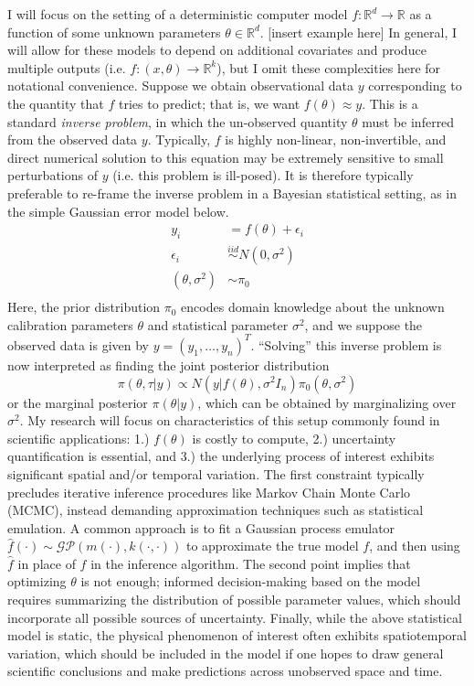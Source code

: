 \documentclass[12pt]{article}
\newcommand{\R}{\mathcal{R}}
\def\R{\mathbb{R}}
\begin{document}
I will focus on the setting of a deterministic computer model $f: \R^d \to \R$ as a function of some unknown parameters $\theta \in \R^d$. [insert example here] In general, I will allow
for these models to depend on additional covariates and produce multiple outputs (i.e. $f: (x, \theta) \to \R^k$), but I omit these complexities here for notational convenience. Suppose 
we obtain observational data $y$ corresponding to the quantity that $f$ tries to predict; that is, we want $f(\theta) \approx y$. This is a standard \textit{inverse problem}, in which
the un-observed quantity $\theta$ must be inferred from the observed data $y$. Typically, $f$ is highly non-linear, non-invertible, and direct numerical solution to this equation may be extremely sensitive
to small perturbations of $y$ (i.e. this problem is ill-posed). It is therefore typically preferable to re-frame the inverse problem in a Bayesian statistical setting, as in the simple Gaussian error model below. 
\begin{align*}
y_i &= f(\theta) + \epsilon_i \\
\epsilon_i &\overset{iid}{\sim} N(0, \sigma^2) \\
(\theta, \sigma^2) &\sim \pi_0 \\
\end{align*}
Here, the prior distribution $\pi_0$ encodes domain knowledge about the unknown calibration parameters $\theta$ and statistical parameter $\sigma^2$, and we suppose the observed data is given by 
$y = (y_1, \dots, y_n)^T$. ``Solving'' this inverse problem is now interpreted as finding the joint posterior distribution
\[\pi(\theta, \tau|y) \propto N(y|f(\theta), \sigma^2 I_n)\pi_0(\theta, \sigma^2)\]
or the marginal posterior $\pi(\theta|y)$, which can be obtained by marginalizing over $\sigma^2$. My research will focus on characteristics of this setup commonly found in scientific applications: 1.) $f(\theta)$ is
costly to compute, 2.) uncertainty quantification is essential, and 3.) the underlying process of interest exhibits significant spatial and/or temporal variation. The first constraint typically precludes iterative inference 
procedures like Markov Chain Monte Carlo (MCMC), instead demanding approximation techniques such as statistical emulation. A common approach is to fit a Gaussian process emulator 
$\hat{f}(\cdot) \sim \mathcal{GP}(m(\cdot), k(\cdot, \cdot))$ to approximate the true model $f$, and then using $\hat{f}$ in place of $f$ in the inference algorithm. The second point implies that optimizing $\theta$ is not enough; informed  decision-making based on the model requires summarizing the distribution of possible parameter values, which should incorporate all possible sources of uncertainty. Finally, while the above statistical model is static, the physical phenomenon of interest often exhibits spatiotemporal variation, which should be included in the model if one hopes to draw general scientific conclusions and make predictions 
across unobserved space and time. \\
\end{document}
